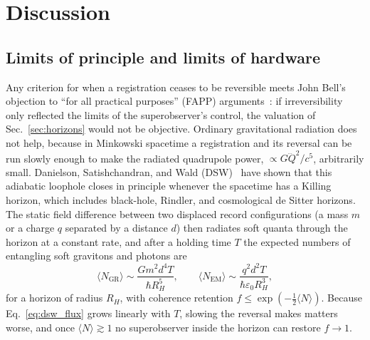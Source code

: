 \section{Discussion}
\label{sec:dsw_ceilings}

\subsection{Limits of principle and limits of hardware}

Any criterion for when a registration ceases to be reversible meets John Bell's objection to ``for all practical purposes'' (FAPP) arguments~\cite{bell1990}: if irreversibility only reflected the limits of the superobserver's control, the valuation of Sec.~\ref{sec:horizons} would not be objective. Ordinary gravitational radiation does not help, because in Minkowski spacetime a registration and its reversal can be run slowly enough to make the radiated quadrupole power, $\propto G \dddot{Q}^2 / c^5$, arbitrarily small. Danielson, Satishchandran, and Wald (DSW)~\cite{danielson2023,danielson2025} have shown that this adiabatic loophole closes in principle whenever the spacetime has a Killing horizon, which includes black-hole, Rindler, and cosmological de Sitter horizons. The static field difference between two displaced record configurations (a mass $m$ or a charge $q$ separated by a distance $d$) then radiates soft quanta through the horizon at a constant rate, and after a holding time $T$ the expected numbers of entangling soft gravitons and photons are~\cite{danielson2023}
\begin{equation}
    \langle N_{\mathrm{GR}} \rangle \sim \frac{G m^2 d^4 T}{\hbar R_H^5}, \qquad \langle N_{\mathrm{EM}} \rangle \sim \frac{q^2 d^2 T}{\hbar \varepsilon_0 R_H^3},
    \label{eq:dsw_flux}
\end{equation}
for a horizon of radius $R_H$, with coherence retention $f \le \exp(-\frac{1}{2}\langle N \rangle)$. Because Eq.~\eqref{eq:dsw_flux} grows linearly with $T$, slowing the reversal makes matters worse, and once $\langle N \rangle \gtrsim 1$ no superobserver inside the horizon can restore $f \to 1$.

